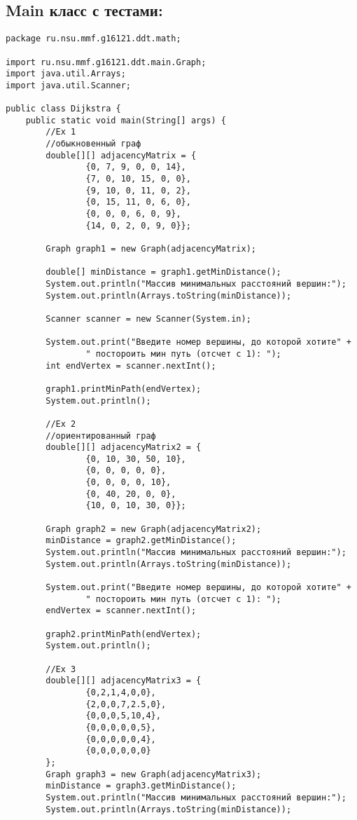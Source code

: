 \subsection{Main класс с тестами:}
\begin{verbatim}
package ru.nsu.mmf.g16121.ddt.math;

import ru.nsu.mmf.g16121.ddt.main.Graph;
import java.util.Arrays;
import java.util.Scanner;

public class Dijkstra {
    public static void main(String[] args) {
        //Ex 1
        //обыкновенный граф
        double[][] adjacencyMatrix = {
                {0, 7, 9, 0, 0, 14},
                {7, 0, 10, 15, 0, 0},
                {9, 10, 0, 11, 0, 2},
                {0, 15, 11, 0, 6, 0},
                {0, 0, 0, 6, 0, 9},
                {14, 0, 2, 0, 9, 0}};

        Graph graph1 = new Graph(adjacencyMatrix);

        double[] minDistance = graph1.getMinDistance();
        System.out.println("Массив минимальных расстояний вершин:");
        System.out.println(Arrays.toString(minDistance));

        Scanner scanner = new Scanner(System.in);

        System.out.print("Введите номер вершины, до которой хотите" +
                " постороить мин путь (отсчет с 1): ");
        int endVertex = scanner.nextInt();

        graph1.printMinPath(endVertex);
        System.out.println();

        //Ex 2
        //ориентированный граф
        double[][] adjacencyMatrix2 = {
                {0, 10, 30, 50, 10},
                {0, 0, 0, 0, 0},
                {0, 0, 0, 0, 10},
                {0, 40, 20, 0, 0},
                {10, 0, 10, 30, 0}};

        Graph graph2 = new Graph(adjacencyMatrix2);
        minDistance = graph2.getMinDistance();
        System.out.println("Массив минимальных расстояний вершин:");
        System.out.println(Arrays.toString(minDistance));

        System.out.print("Введите номер вершины, до которой хотите" +
                " постороить мин путь (отсчет с 1): ");
        endVertex = scanner.nextInt();

        graph2.printMinPath(endVertex);
        System.out.println();

        //Ex 3
        double[][] adjacencyMatrix3 = {
                {0,2,1,4,0,0},
                {2,0,0,7,2.5,0},
                {0,0,0,5,10,4},
                {0,0,0,0,0,5},
                {0,0,0,0,0,4},
                {0,0,0,0,0,0}
        };
        Graph graph3 = new Graph(adjacencyMatrix3);
        minDistance = graph3.getMinDistance();
        System.out.println("Массив минимальных расстояний вершин:");
        System.out.println(Arrays.toString(minDistance));


\end{verbatim}
